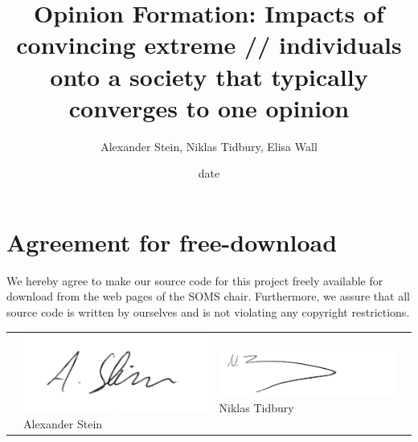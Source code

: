 \documentclass[11pt]{article}
\title{Opinion Formation: Impacts of convincing extreme //
individuals onto a society that typically converges to one opinion}
\author{Alexander Stein, Niklas Tidbury, Elisa Wall}
\date{date}
\begin{document}

\newpage


\newpage
\section*{Agreement for free-download}
\bigskip


\bigskip


\large We hereby agree to make our source code for this project freely available for download from the web pages of the SOMS chair. Furthermore, we assure that all source code is written by ourselves and is not violating any copyright restrictions.

\begin{center}

\bigskip


\bigskip


\begin{tabular}{@{}p{1cm}@{}p{5cm}@{}@{}p{5cm}@{}@{}p{5cm}@{}}
\begin{minipage}{1cm}
\end{minipage}
&
\begin{minipage}{5cm}
\includegraphics[width=\linewidth]{2017-12-18_21-09_Seite_1.pdf}
\vspace{1mm} \large Alexander Stein

 \vspace{\baselineskip}

\end{minipage}
&
\begin{minipage}{5cm}
\includegraphics[width=\linewidth]{Niklas.pdf}
\vspace{-9mm}\large Niklas Tidbury
	\vspace{\baselineskip}




\end{minipage}
\end{tabular}
\end{center}
\end{document}
